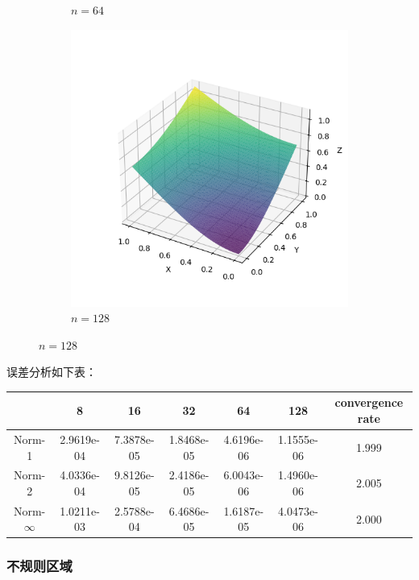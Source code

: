 \documentclass[lang=cn,a4paper,newtx,bibend=bibtex]{elegantpaper}
\begin{document}
\begin{figure}[H]
\begin{subfigure}[b]{0.18\textwidth}
      \caption{$n = 64$}
  \end{subfigure}
  \hfill
  \begin{subfigure}[b]{0.18\textwidth}
      \includegraphics[width=\textwidth]{../../res_bac/res-[data|3-mixed-regular-e128].png}
      \caption{$n = 128$}
  \end{subfigure}
\end{figure}

误差分析如下表：

\begin{table}[H]
  \centering
  \begin{tabular}{|c|c|c|c|c|c|c|}
  \hline
   & 8 & 16 & 32 & 64 & 128 & convergence rate \\
  \hline
  Norm-1 & 2.9619e-04 & 7.3878e-05 & 1.8468e-05 & 4.6196e-06 & 1.1555e-06 &  1.999 \\
  Norm-2 & 4.0336e-04 & 9.8126e-05 & 2.4186e-05 & 6.0043e-06 & 1.4960e-06 &  2.005 \\
  Norm-$\infty$ & 1.0211e-03 & 2.5788e-04 & 6.4686e-05 & 1.6187e-05 & 4.0473e-06 & 2.000 \\
  \hline
  \end{tabular}
  \end{table}

\subsubsection{不规则区域}
\end{document}

